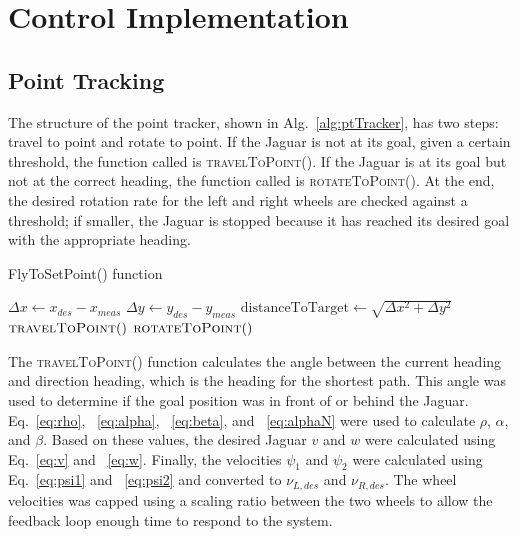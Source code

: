 \documentclass[conference]{../IEEEtran}
\begin{document}
\section{Control Implementation}\label{sec:implement}

\subsection{Point Tracking}

The structure of the point tracker, shown in Alg.~\ref{alg:ptTracker}, has two steps:
travel to point and rotate to point. If the Jaguar is not at its goal, given a certain
threshold, the function called is \textsc{travelToPoint()}. If the Jaguar is at its goal
but not at the correct heading, the function called is \textsc{rotateToPoint()}. At the
end, the desired rotation rate for the left and right wheels are checked against a
threshold; if smaller, the Jaguar is stopped because it has reached its desired goal with
the appropriate heading.

\begin{algorithm}[h]
  \caption{FlyToSetPoint() function}
  \begin{algorithmic}[1]
      \State $\Delta x \gets x_{des}-x_{meas}$
      \State $\Delta y \gets y_{des}-y_{meas}$
      \State $\text{distanceToTarget} \gets \sqrt{\Delta x^2+\Delta y^2}$
      \medskip
      \State $\textsc{travelToPoint}()$
      \Else
          \State $\textsc{rotateToPoint}()$
      \EndIf
      \medskip

    \end{algorithmic}
  \label{alg:ptTracker}
\end{algorithm}

The \textsc{travelToPoint()} function calculates the angle between the current heading and
direction heading, which is the heading for the shortest path. This angle was used to
determine if the goal position was in front of or behind the Jaguar. Eq.~\ref{eq:rho},
~\ref{eq:alpha}, ~\ref{eq:beta}, and ~\ref{eq:alphaN} were used to calculate $\rho$,
$\alpha$, and $\beta$. Based on these values, the desired Jaguar $v$ and $w$ were
calculated using Eq.~\ref{eq:v} and ~\ref{eq:w}. Finally, the velocities $\psi_1$ and
$\psi_2$ were calculated using Eq.~\ref{eq:psi1} and ~\ref{eq:psi2} and converted to
$\nu_{L,des}$ and $\nu_{R,des}$. The wheel velocities was capped using a scaling ratio
between the two wheels to allow the feedback loop enough time to respond to the system.
\end{document}
